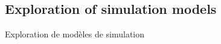 














\subsection*{Exploration of simulation models}{Exploration de modèles de simulation}


